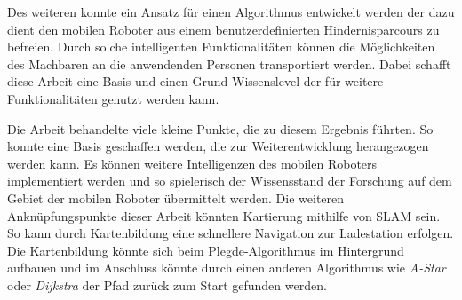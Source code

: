 Des weiteren konnte ein Ansatz für einen Algorithmus entwickelt werden der dazu dient den mobilen Roboter aus einem benutzerdefinierten Hindernisparcours zu befreien. Durch solche intelligenten Funktionalitäten können die Möglichkeiten des Machbaren an die anwendenden Personen transportiert werden. Dabei schafft diese Arbeit eine Basis und einen Grund-Wissenslevel der für weitere Funktionalitäten genutzt werden kann.
 
Die Arbeit behandelte viele kleine Punkte, die zu diesem Ergebnis führten. So konnte eine Basis geschaffen werden, die zur Weiterentwicklung herangezogen werden kann. Es können weitere Intelligenzen des mobilen Roboters implementiert werden und so spielerisch der Wissensstand der Forschung auf dem Gebiet der mobilen Roboter übermittelt werden. Die weiteren Anknüpfungspunkte dieser Arbeit könnten Kartierung mithilfe von SLAM sein. So kann durch Kartenbildung eine schnellere Navigation zur Ladestation erfolgen. Die Kartenbildung könnte sich beim Plegde-Algorithmus im Hintergrund aufbauen und im Anschluss könnte durch einen anderen Algorithmus wie \textit{A-Star} oder \textit{Dijkstra} der Pfad zurück zum Start gefunden werden.  